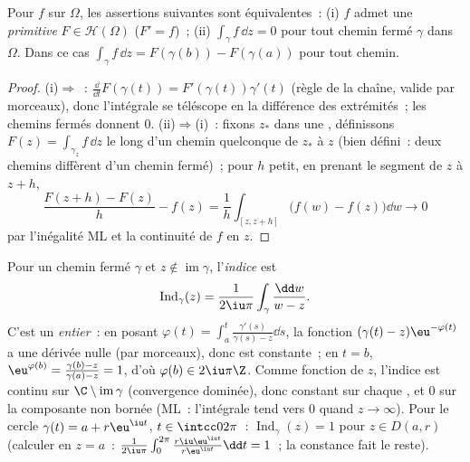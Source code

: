 \begin{proposition}[Primitives]\label{prop:b3:holomorphic:primitive}
Pour $f$  sur $\Omega$, les assertions suivantes sont
équivalentes~: (i) $f$ admet une \emph{primitive} $F \in
\mathcal H(\Omega)$ ($F' = f$)~; (ii) $\int_\gamma f\,\dd z =
0$ pour tout chemin fermé $\gamma$ dans $\Omega$. Dans ce cas
$\int_\gamma f\,\dd z = F(\gamma(b)) - F(\gamma(a))$ pour tout
chemin.
\end{proposition}

\begin{proof}
(i)$\Rightarrow$~: $\frac{\dd}{\dd t}F(\gamma(t)) =
F'(\gamma(t))\gamma'(t)$ (règle de la chaîne, valide par
morceaux), donc l'intégrale se téléscope en la différence des
extrémités~; les chemins fermés donnent $0$. (ii)$\Rightarrow$(i)~:
fixons $z_*$ dans une , définissons $F(z) =
\int_{\gamma_z}f\,\dd z$ le long d'un chemin quelconque de $z_*$
à $z$ (bien défini~: deux chemins diffèrent d'un chemin fermé)~;
pour $h$ petit, en prenant le segment de $z$ à $z + h$,
\[
\frac{F(z + h) - F(z)}{h} - f(z)
= \frac1h\int_{[z, z+h]}\bigl(f(w) - f(z)\bigr)\dd w
\longrightarrow 0
\]
par l'inégalité ML et la continuité de $f$ en $z$.
\end{proof}

\begin{definition}\label{def:b3:holomorphic:index}
Pour un chemin fermé $\gamma$ et $z \notin
\operatorname{im}\gamma$, l'\emph{indice} est
\[
\operatorname{Ind}_\gamma(z) = \frac1{2\iu\pi}
\int_\gamma\frac{\dd w}{w - z} .
\]
C'est un \emph{entier}~: en posant $\varphi(t) =
\int_a^t\frac{\gamma'(s)}{\gamma(s) - z}\dd s$, la fonction
$(\gamma(t) - z)\eu^{-\varphi(t)}$ a une dérivée nulle (par
morceaux), donc est constante~; en $t = b$, $\eu^{\varphi(b)} =
\frac{\gamma(b) - z}{\gamma(a) - z} = 1$, d'où $\varphi(b) \in
2\iu\pi\Z$. Comme fonction de $z$, l'indice est continu sur
$\C\setminus\operatorname{im}\gamma$ (convergence dominée),
donc constant sur chaque , et $0$ sur la
composante non bornée (ML~: l'intégrale tend vers $0$ quand
$z \to \infty$). Pour le cercle $\gamma(t) = a + r\eu^{\iu t}$,
$t \in \intcc0{2\pi}$~: $\operatorname{Ind}_\gamma(z) = 1$ pour
$z \in D(a,r)$ (calculer en $z = a$~: $\frac1{2\iu\pi}
\int_0^{2\pi}\frac{r\iu\eu^{\iu t}}{r\eu^{\iu t}}\dd t = 1$~;
la constance fait le reste).
\end{definition}

